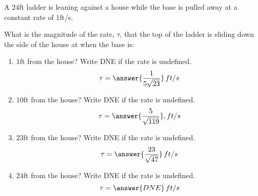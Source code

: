 \documentclass{ximera}
\author{Gregory Hartman \and Matthew Carr}
\begin{document}
\begin{exercise}



A $24$ft ladder is leaning against a house while the base is pulled away at a constant rate of $1$ft/s.

What is the magnitude of the rate, $\tau$, that the top of the ladder is sliding down the side of the house at when the base is:

\begin{enumerate}
\item		$1$ft from the house? Write DNE if the rate is undefined. \[\tau=\answer{\frac{1}{5\sqrt{23}}}\,ft/s\]
\item		$10$ft from the house? Write DNE if the rate is undefined.
 \[\tau=\answer{\frac{5}{\sqrt{119}}},ft/s\]
\item		$23$ft from the house? Write DNE if the rate is undefined. \[\tau=\answer{\frac{23}{\sqrt{47}}}\,ft/s\]
\item		$24$ft from the house? Write DNE if the rate is undefined. \[\tau=\answer{DNE}\,ft/s\]
\end{enumerate}


\end{exercise}
\end{document}
